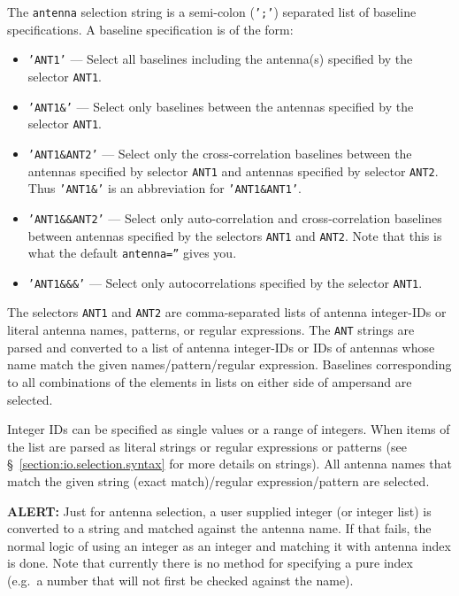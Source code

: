The {\tt antenna} selection string is a semi-colon ({\tt ';'}) 
separated list of baseline specifications. 
A baseline specification is of the form:
\begin{itemize}

\item {\tt 'ANT1'} --- Select all baselines including the antenna(s)
    specified by the selector {\tt ANT1}.

\item {\tt 'ANT1\&'} --- Select only baselines between the antennas
     specified by the selector {\tt ANT1}.

\item {\tt 'ANT1\&ANT2'} --- Select only the cross-correlation
     baselines between the
     antennas specified by selector {\tt ANT1} and antennas specified
     by selector {\tt ANT2}.  Thus {\tt 'ANT1\&'} is an abbreviation for
     {\tt 'ANT1\&ANT1'}.

\item {\tt 'ANT1\&\&ANT2'} --- Select only auto-correlation and
     cross-correlation baselines between antennas specified by
     the selectors {\tt ANT1} and {\tt ANT2}.  Note that this
     is what the default {\tt antenna=''} gives you.

\item {\tt 'ANT1\&\&\&'} --- Select only autocorrelations specified by
     the selector {\tt ANT1}. 

\end{itemize}
The selectors {\tt ANT1} and {\tt ANT2} are comma-separated lists of
antenna integer-IDs or literal antenna names, patterns, or regular
expressions.  The {\tt ANT} strings are parsed and converted to a list
of antenna integer-IDs or IDs of antennas whose name match the given
names/pattern/regular expression.  Baselines corresponding to all
combinations of the elements in lists on either side of ampersand are
selected.

Integer IDs can be specified as single values or a range of integers.
When items of the list are parsed as literal strings or regular
expressions or patterns (see \S~\ref{section:io.selection.syntax} 
for more details on strings).  All antenna names that match the given 
string (exact match)/regular expression/pattern are selected.

{\bf ALERT:} Just for antenna selection, a user supplied integer (or
integer list) is converted to a string and matched against the antenna
name. If that fails, the normal logic of using an integer as an
integer and matching it with antenna index is done.  Note that
currently there is no method for specifying a pure index (e.g.\ a
number that will not first be checked against the name).

